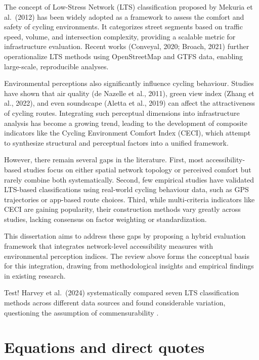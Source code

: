 \documentclass[
  12pt,
  oneside]{book}
\begin{document}
The concept of Low-Stress Network (LTS) classification proposed by Mekuria et al.~(2012) has been widely adopted as a framework to assess the comfort and safety of cycling environments. It categorizes street segments based on traffic speed, volume, and intersection complexity, providing a scalable metric for infrastructure evaluation. Recent works (Conveyal, 2020; Broach, 2021) further operationalize LTS methods using OpenStreetMap and GTFS data, enabling large-scale, reproducible analyses.

Environmental perceptions also significantly influence cycling behaviour. Studies have shown that air quality (de Nazelle et al., 2011), green view index (Zhang et al., 2022), and even soundscape (Aletta et al., 2019) can affect the attractiveness of cycling routes. Integrating such perceptual dimensions into infrastructure analysis has become a growing trend, leading to the development of composite indicators like the Cycling Environment Comfort Index (CECI), which attempt to synthesize structural and perceptual factors into a unified framework.

However, there remain several gaps in the literature. First, most accessibility-based studies focus on either spatial network topology or perceived comfort but rarely combine both systematically. Second, few empirical studies have validated LTS-based classifications using real-world cycling behaviour data, such as GPS trajectories or app-based route choices. Third, while multi-criteria indicators like CECI are gaining popularity, their construction methods vary greatly across studies, lacking consensus on factor weighting or standardization.

This dissertation aims to address these gaps by proposing a hybrid evaluation framework that integrates network-level accessibility measures with environmental perception indices. The review above forms the conceptual basis for this integration, drawing from methodological insights and empirical findings in existing research.

Test!
Harvey et al.~(2024) systematically compared seven LTS classification methods across different data sources and found considerable variation, questioning the assumption of commensurability \autocite{harvey_comparing_2024}.

\chapter{Equations and direct quotes}\label{equations-and-direct-quotes}
\end{document}
